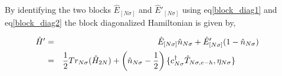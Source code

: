 \documentclass[12pt,a4paper]{article}
\begin{document}
By identifying the two blocks $\hat{E}_{[N\sigma]}$ and $\hat{E}'_{[N\sigma]}$ using eq\eqref{block_diag1} and eq\eqref{block_diag2}  the block diagonalized Hamiltonian is given by,
\begin{tcolorbox}
\begin{eqnarray}
\hspace*{-0.5cm}
\hat{H}' &=& \hat{E}_{[N\sigma]}\hat{n}_{N\sigma}+\hat{E}'_{[N\sigma]}(1-\hat{n}_{N\sigma})\nonumber\\
\hspace*{-1.2cm}				&=&\frac{1}{2}Tr_{N\sigma}(\hat{H}_{2N})+\left(\hat{n}_{N\sigma}-\frac{1}{2}\right)\lbrace c^{\dagger}_{N\sigma}\hat{T}_{N\sigma,e-h},\eta_{N\sigma}\rbrace\hspace*{1cm}\label{block_diag_ham}
\end{eqnarray}
\end{tcolorbox}
\end{document}
